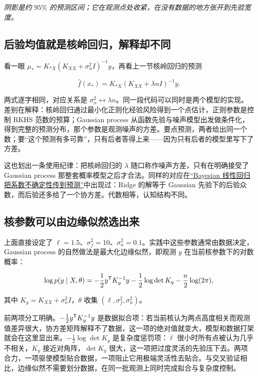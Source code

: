\emph{阴影是约 \(95\%\) 的预测区间；它在观测点处收紧，在没有数据的地方张开到先验宽度。}

\subsection{后验均值就是核岭回归，解释却不同}

看一眼 \(\mu_*=K_{*X}(K_{XX}+\sigma_n^2I)^{-1}y\)，再看上一节核岭回归的预测

\[
\widehat f(x_*)=K_{*X}(K_{XX}+\lambda nI)^{-1}y.
\]

两式逐字相同，对应关系是 \(\sigma_n^2\leftrightarrow \lambda n\)。同一段代码可以同时是两个模型的实现。差别在解释：核岭回归通过最小化正则化经验风险得到一个点估计，正则参数是控制 RKHS 范数的预算；Gaussian process 从函数先验与噪声模型出发做条件化，得到完整的预测分布，那个参数是观测噪声的方差。要点预测，两者给出同一个数；要``这个预测有多可靠''，只有后者答得上来——因为只有后者的模型里写下了方差。

这也划出一条使用纪律：把核岭回归的 \(\lambda\) 随口称作噪声方差，只有在明确接受了 Gaussian process 那整套概率模型之后才合法。同样的对应在\hyperref[sec:13-Machine-Learning/02-Linear-Models/04]{``Bayesian 线性回归把系数不确定性传到预测''}中出现过：Ridge 的解等于 Gaussian 先验下的后验众数，而后验还多给了一个协方差。代数相等，认知结构不同。

\subsection{核参数可以由边缘似然选出来}

上面直接设定了 \(\ell=1.5\)、\(\sigma_f^2=10\)、\(\sigma_n^2=0.1\)。实践中这些参数通常由数据决定，Gaussian process 的自然做法是最大化边缘似然，即观测 \(y\) 在当前核参数下的对数概率：

\[
\log p(y\mid X,\theta)
=-\frac12 y^{\mathsf{T}}K_y^{-1}y
-\frac12\log\det K_y
-\frac n2\log(2\pi),
\]

其中 \(K_y=K_{XX}+\sigma_n^2I\)，\(\theta\) 收集 \((\ell,\sigma_f^2,\sigma_n^2)\)。

前两项分工明确。\(-\tfrac12 y^{\mathsf{T}}K_y^{-1}y\) 是数据拟合项：若当前核认为两点高度相关而观测值差异很大，协方差矩阵解释不了数据，这一项的绝对值就变大，模型和数据打架就会在这里显出来。\(-\tfrac12\log\det K_y\) 是复杂度惩罚项：\(\ell\) 很小时所有点被认为几乎不相关，\(K_y\) 接近对角阵，\(\det K_y\) 很大，这一项把过度灵活的先验压下去。两项合力，一项驱使模型贴合数据，一项阻止它用极端灵活性去贴合。与交叉验证相比，边缘似然不需要划分数据，在同一批观测上同时完成拟合与复杂度控制。


